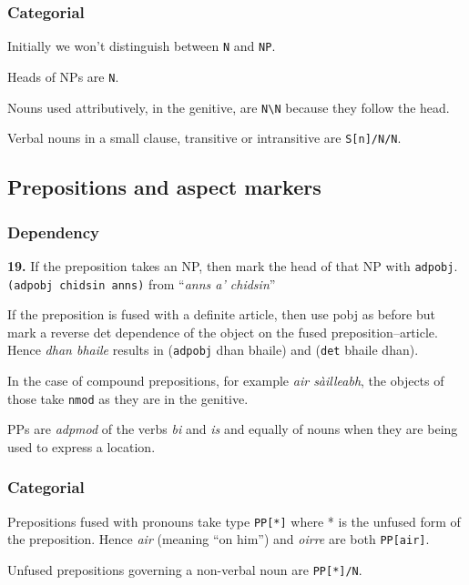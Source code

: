\documentclass[a4paper]{article}
\begin{document}
\subsubsection{Categorial}

Initially we won't distinguish between \texttt{N} and \texttt{NP}.

 Heads of NPs are \texttt{N}.

 Nouns used attributively, in the genitive, are \texttt{N\textbackslash N} because they follow the head.

 Verbal nouns in a small clause, transitive or intransitive are \texttt{S[n]/N/N}.


\subsection{Prepositions and aspect markers}

\subsubsection{Dependency}

{\bf 19.} If the preposition takes an NP, then mark the head of that NP with \texttt{adpobj}. \texttt{(adpobj chidsin anns)} from ``\textit{anns a' chidsin}''

 If the preposition is fused with a definite article, then use pobj as before but mark a reverse det dependence of the object on the fused preposition--article. Hence \textit{dhan bhaile} results in (\texttt{adpobj} dhan bhaile) and (\texttt{det} bhaile dhan).

 In the case of compound prepositions, for example \textit{air s\`ailleabh}, the objects of those take \texttt{nmod} as they are in the genitive.

 PPs are \textit{adpmod} of the verbs \textit{bi} and \textit{is} and equally of nouns when they are being used to express a location.

\subsubsection{Categorial}
 Prepositions fused with pronouns take type \texttt{PP[*]} where * is the unfused form of the preposition.
Hence \textit{air} (meaning ``on him'') and \textit{oirre} are both \texttt{PP[air]}.

 Unfused prepositions governing a non-verbal noun are \texttt{PP[*]/N}.
\end{document}
